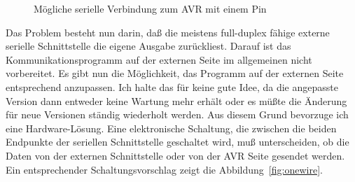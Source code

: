 \begin{figure}[H]
\centering
{}
\caption{Mögliche serielle Verbindung zum AVR mit einem Pin}
\label{fig:onewire-simple}
\end{figure}

Das Problem besteht nun darin, daß die meistens full-duplex fähige externe serielle Schnittstelle
die eigene Ausgabe zurückliest.
Darauf ist das Kommunikationsprogramm auf der externen Seite im allgemeinen nicht vorbereitet.
Es gibt nun die Möglichkeit, das Programm auf der externen Seite entsprechend anzupassen.
Ich halte das für keine gute Idee, da die angepasste Version dann entweder keine Wartung
mehr erhält oder es müßte die Änderung für neue Versionen ständig wiederholt werden.
Aus diesem Grund bevorzuge ich eine Hardware-Lösung.
Eine elektronische Schaltung, die zwischen die beiden Endpunkte der seriellen Schnittstelle
geschaltet wird, muß unterscheiden, ob die Daten von der externen Schnittstelle oder
von der AVR Seite gesendet werden.
Ein entsprechender Schaltungsvorschlag zeigt die Abbildung~\ref{fig:onewire}.

